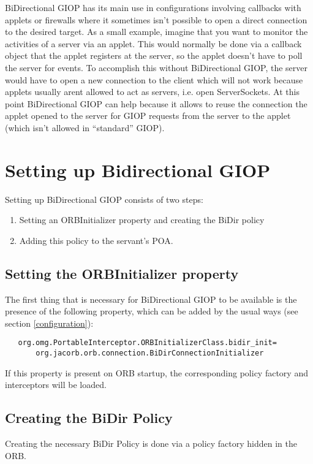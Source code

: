 \documentclass[12pt]{scrbook}
\begin{document}
BiDirectional GIOP has its main use in configurations involving callbacks with
applets or firewalls where it sometimes isn't possible to open a direct
connection to the desired target. As a small example, imagine that you want to
monitor the activities of a server via an applet. This would normally be done
via a callback object that the applet registers at the server, so the applet
doesn't have to poll the server for events. To accomplish this without
BiDirectional GIOP, the server would have to open a new connection to the
client which will not work because applets usually arent allowed to act as
servers, i.e. open ServerSockets. At this point BiDirectional GIOP can help
because it allows to reuse the connection the applet opened to the server for
GIOP requests from the server to the applet (which isn't allowed in
``standard'' GIOP).

\section{Setting up Bidirectional GIOP}

Setting up BiDirectional GIOP consists of two steps:
\begin{enumerate}
\item Setting an ORBInitializer property and  creating the BiDir policy
\item Adding this policy to the servant's POA.
\end{enumerate}

\subsection{Setting the ORBInitializer property}

The first thing that is necessary for BiDirectional GIOP to be available is
the presence of the following property, which can be added by the usual ways
(see section \ref{configuration}):

\begin{verbatim}
   org.omg.PortableInterceptor.ORBInitializerClass.bidir_init=
       org.jacorb.orb.connection.BiDirConnectionInitializer
\end{verbatim}

If this property is present on ORB startup, the corresponding policy factory
and interceptors will be loaded.


\subsection{Creating the BiDir Policy}
Creating the necessary BiDir Policy is done via a policy factory hidden in the
ORB.
\end{document}
